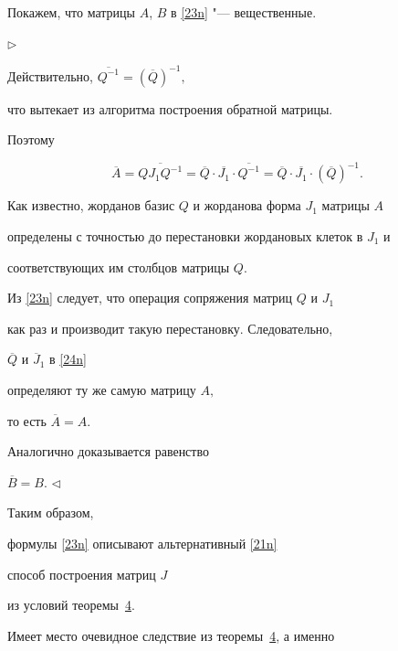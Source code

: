  Покажем, что  матрицы $A$, $B$ в \eqref{23n} "---  вещественные.



\smallskip



 $\triangleright$

 Действительно, $\overline{Q^{-1}}=\left(\overline{Q}\right)^{-1},$

 что вытекает из алгоритма построения обратной матрицы.

 Поэтому

 \begin{equation}

 \overline{A}=\overline{QJ_1Q^{-1}}=

\overline{Q}\cdot\overline{J_1}\cdot\overline{Q^{-1}}=

\overline{Q}\cdot\overline{J_1}\cdot\left(\overline{Q}\right)^{-1}.

 \label{24n}

\end{equation}



Как известно, жорданов базис $Q$ и жорданова  форма $J_1$ матрицы $A$

определены с точностью до перестановки жордановых клеток в $J_1$ и

соответствующих им столбцов матрицы $Q.$

Из \eqref{23n}  следует, что операция сопряжения матриц $Q$ и $J_1$

как раз и производит такую перестановку.  Следовательно,

$\overline{Q}$ и $\overline{J}_1$ в \eqref{24n}

 определяют ту же самую матрицу $A,$

то есть  $\overline{A}=A.$

  Аналогично доказывается равенство

  $\overline{B}=B.$ $\triangleleft$

\smallskip



 Таким образом,

формулы \eqref{23n} описывают альтернативный \eqref{21n}

способ построения  матриц $J$

из условий теоремы~\hyperlink{nik:th4}{4}.





Имеет место очевидное следствие из теоремы~\hyperlink{nik:th4}{4}, а именно



